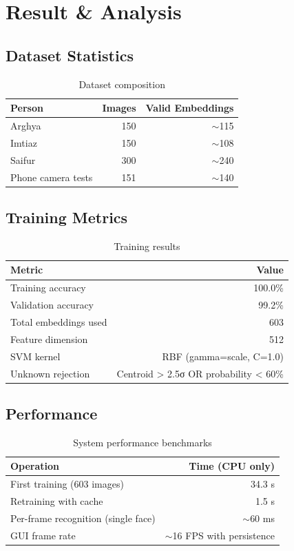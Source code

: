 \documentclass[12pt,a4paper]{article}
\begin{document}
\section{Result \& Analysis}

\subsection*{Dataset Statistics}
\begin{table}[H]
\centering
\begin{tabular}{lrr}
\toprule
\textbf{Person} & \textbf{Images} & \textbf{Valid Embeddings} \\
\midrule
Arghya & 150 & $\sim$115 \\
Imtiaz & 150 & $\sim$108 \\
Saifur & 300 & $\sim$240 \\
Phone camera tests & 151 & $\sim$140 \\
\bottomrule
\end{tabular}
\caption{Dataset composition}
\end{table}

\subsection*{Training Metrics}
\begin{table}[H]
\centering
\begin{tabular}{lr}
\toprule
\textbf{Metric} & \textbf{Value} \\
\midrule
Training accuracy & 100.0\% \\
Validation accuracy & 99.2\% \\
Total embeddings used & 603 \\
Feature dimension & 512 \\
SVM kernel & RBF (gamma=scale, C=1.0) \\
Unknown rejection & Centroid > 2.5σ OR probability < 60\% \\
\bottomrule
\end{tabular}
\caption{Training results}
\end{table}

\subsection*{Performance}
\begin{table}[H]
\centering
\begin{tabular}{lr}
\toprule
\textbf{Operation} & \textbf{Time (CPU only)} \\
\midrule
First training (603 images) & 34.3 s \\
Retraining with cache & 1.5 s \\
Per-frame recognition (single face) & $\sim$60 ms \\
GUI frame rate & $\sim$16 FPS with persistence \\
\bottomrule
\end{tabular}
\caption{System performance benchmarks}
\end{table}
\end{document}
